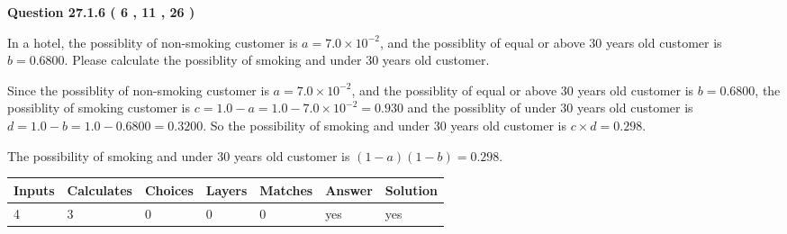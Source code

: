 \documentclass[12pt]{article}
\begin{document}
   
  
\vspace{0.2in}
  
{\textbf{\Large{Question
27.1.6 
 (           6 ,          11 ,          26 )
}}}
  
  
In a hotel, the possiblity of  %
non-smoking customer is
$a =  %
7.0 \times 10^{-2}$, and the possiblity of  %
equal or above 30 years old customer is $ b =  %
0.6800$.
Please calculate the possiblity of  %
smoking and  %
under 30 years old customer.
 
 
 
\noindent{}
 
 

Since the possiblity of  %
 non-smoking customer is $ a =  %
7.0 \times 10^{-2} $,
and the possiblity of  %
equal or above 30 years old customer is $ b =  %
0.6800 $,
the possiblity of  %
smoking customer is $ c = 1.0 - a = 1.0 -
7.0 \times 10^{-2}
=  %
0.930 $ and the possiblity of  %
under 30 years old
customer is $ d = 1.0 - b = 1.0 -  %
0.6800 =  %
0.3200  $.
So the possibility of  %
smoking and  %
under 30 years old
customer is $ c \times d =  %
0.298 $.
 
 
 
\noindent{}
 
 

 
 
 
\noindent{}
 
 

The possibility of  %
smoking and  %
under 30 years old
customer is $ (1-a)(1-b) =  %
0.298 $.
 
 
\noindent{}
 
 

 
\vspace{0.3in}
   
   
   
   
\noindent\begin{tabular}{|l|l|l|l|l|l|l|}
 \hline
Inputs & Calculates & Choices & Layers & Matches & Answer & Solution \\ \hline
           4  & 
           3  & 
           0
  & 
           0  & 
           0  & 
  yes & 
  yes 
  \\ \hline
 \end{tabular}
   
\end{document}
